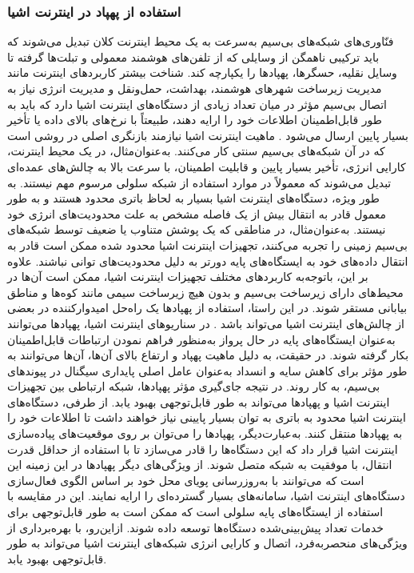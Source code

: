 \subsubsection{استفاده از پهپاد در اینترنت اشیا}
فنّاوری‌های شبکه‌های بی‌سیم به‌سرعت به یک محیط اینترنت کلان تبدیل می‌شوند که باید ترکیبی ناهمگن از وسایلی که از تلفن‌های هوشمند معمولی و تبلت‌ها گرفته تا وسایل نقلیه، حسگرها، پهپادها را یکپارچه کند. شناخت بیشتر کاربردهای اینترنت مانند مدیریت زیرساخت شهرهای هوشمند، بهداشت، حمل‌ونقل و مدیریت انرژی نیاز به اتصال بی‌سیم مؤثر در میان تعداد زیادی از دستگاه‌های اینترنت اشیا دارد که باید به طور قابل‌اطمینان اطلاعات خود را ارایه دهند، طبیعتاً با نرخ‌های بالای داده یا تأخیر بسیار پایین ارسال می‌شود \cite{zanella2014internet,10.1145/3657287,Banerjee}.
ماهیت اینترنت اشیا نیازمند بازنگری اصلی در روشی است که در آن شبکه‌های بی‌سیم سنتی کار می‌کنند. به‌عنوان‌مثال، در یک محیط اینترنت، کارایی انرژی، تأخیر بسیار پایین و قابلیت اطمینان، با سرعت بالا به چالش‌های عمده‌ای تبدیل می‌شوند که معمولاً در موارد استفاده از شبکه سلولی مرسوم مهم نیستند. به طور ویژه، دستگاه‌های اینترنت اشیا بسیار به لحاظ باتری محدود هستند و به طور معمول قادر به انتقال بیش از یک فاصله مشخص به علت محدودیت‌های انرژی خود نیستند.
به‌عنوان‌مثال، در مناطقی که یک پوشش متناوب یا ضعیف توسط شبکه‌های بی‌سیم زمینی را تجربه می‌کنند، تجهیزات اینترنت اشیا محدود شده ممکن است قادر به انتقال داده‌های خود به ایستگاه‌های پایه دورتر به دلیل محدودیت‌های توانی نباشند. علاوه بر این، باتوجه‌به کاربردهای مختلف تجهیزات اینترنت اشیا، ممکن است آن‌ها در محیط‌های دارای زیرساخت بی‌سیم و بدون هیچ زیرساخت سیمی مانند کوه‌ها و مناطق بیابانی مستقر شوند.
در این راستا، استفاده از پهپادها یک راه‌حل امیدوارکننده در بعضی از چالش‌های اینترنت اشیا می‌تواند باشد \cite{10113154}.
در سناریوهای اینترنت اشیا، پهپادها می‌توانند به‌عنوان ایستگاه‌های پایه در حال پرواز به‌منظور فراهم نمودن ارتباطات قابل‌اطمینان بکار گرفته شوند. در حقیقت، به دلیل ماهیت پهپاد و ارتفاع بالای آن‌ها، آن‌ها می‌توانند به طور مؤثر برای کاهش سایه و انسداد به‌عنوان عامل اصلی پایداری سیگنال در پیوندهای بی‌سیم، به کار روند. در نتیجه جای‌گیری مؤثر پهپادها، شبکه ارتباطی بین تجهیزات اینترنت اشیا و پهپادها می‌تواند به طور قابل‌توجهی بهبود یابد. از طرفی، دستگاه‌های اینترنت اشیا محدود به باتری به توان بسیار پایینی نیاز خواهند داشت تا اطلاعات خود را به پهپادها منتقل کنند. به‌عبارت‌دیگر، پهپادها را می‌توان بر روی موقعیت‌های پیاده‌سازی اینترنت اشیا قرار داد که این دستگاه‌ها را قادر می‌سازد تا با استفاده از حداقل قدرت انتقال، با موفقیت به شبکه متصل شوند.
از ویژگی‌های دیگر پهپادها در این زمینه این است که می‌توانند با به‌روزرسانی پویای محل خود بر اساس الگوی فعال‌سازی دستگاه‌های اینترنت اشیا، سامانه‌های  بسیار گسترده‌ای را ارایه نمایند. این در مقایسه با استفاده از ایستگاه‌های پایه سلولی است که ممکن است به طور قابل‌توجهی برای خدمات تعداد پیش‌بینی‌شده دستگاه‌ها توسعه داده شوند. ازاین‌رو، با بهره‌برداری از ویژگی‌های منحصربه‌فرد، اتصال و کارایی انرژی شبکه‌های اینترنت اشیا می‌تواند به طور قابل‌توجهی بهبود یابد.
